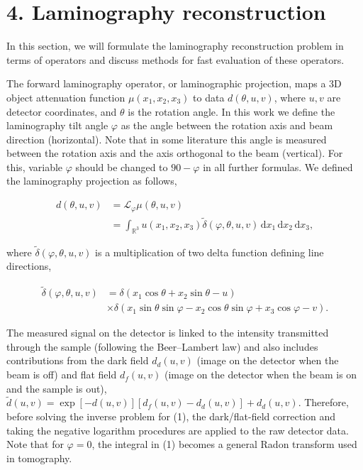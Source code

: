 \documentclass{article}
\begin{document}
\section*{4. Laminography reconstruction}

In this section, we will formulate the laminography reconstruction problem in terms of operators and discuss methods for fast evaluation of these operators.

The forward laminography operator, or laminographic projection, maps a 3D object attenuation function $\mu(x_1, x_2, x_3)$ to data $d(\theta, u, v)$, where $u, v$ are detector coordinates, and $\theta$ is the rotation angle. In this work we define the laminography tilt angle $\varphi$ as the angle between the rotation axis and beam direction (horizontal). Note that in some literature this angle is measured between the rotation axis and the axis orthogonal to the beam (vertical). For this, variable $\varphi$ should be changed to $90 - \varphi$ in all further formulas. We defined the laminography projection as follows,

\begin{equation}
\begin{aligned} d(\theta, u, v) &= \mathcal{L}_\varphi \mu(\theta, u, v) \\ &= \int_{\mathbb{R}^3} u(x_1, x_2, x_3) \tilde{\delta}(\varphi, \theta, u, v)\, \mathrm{d}x_1\, \mathrm{d}x_2\, \mathrm{d}x_3, \end{aligned}
\tag{1}
\end{equation}

where $\tilde{\delta}(\varphi, \theta, u, v)$ is a multiplication of two delta function defining line directions,

\begin{equation}
\begin{aligned} \tilde{\delta}(\varphi, \theta, u, v) &= \delta(x_1 \cos \theta + x_2 \sin \theta - u) \\ &\times \delta(x_1 \sin \theta \sin \varphi - x_2 \cos \theta \sin \varphi + x_3 \cos \varphi - v). \end{aligned}
\tag{2}
\end{equation}

The measured signal on the detector is linked to the intensity transmitted through the sample (following the Beer–Lambert law) and also includes contributions from the dark field $d_d(u, v)$ (image on the detector when the beam is off) and flat field $d_f(u, v)$ (image on the detector when the beam is on and the sample is out), $\tilde{d}(u, v) = \exp[-d(u, v)][d_f(u, v) - d_d(u, v)] + d_d(u, v)$. Therefore, before solving the inverse problem for (1), the dark/flat-field correction and taking the negative logarithm procedures are applied to the raw detector data. Note that for $\varphi = 0$, the integral in (1) becomes a general Radon transform used in tomography.
\end{document}

